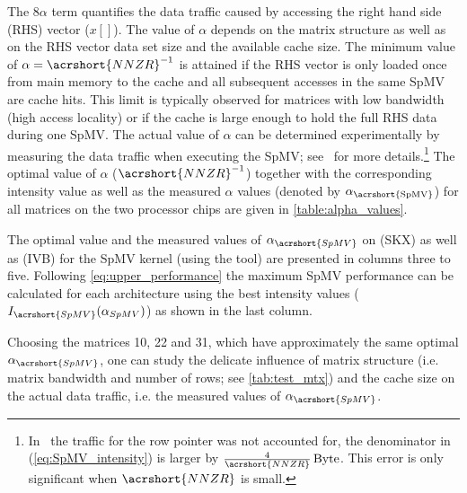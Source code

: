 The $8\alpha$ term quantifies the data traffic caused by accessing the right hand side (RHS) vector ($x[]$). The value of $\alpha$ depends on the matrix structure as well as on the RHS vector data set size and the available cache size. The minimum value of $\alpha=\acrshort{NNZR}^{-1}$ is attained if the RHS vector is only loaded once from main memory to the cache and all subsequent accesses in the same \acrshort{SpMV} are cache hits.  This limit is typically observed for matrices with low bandwidth (high access locality) or if the cache is large enough to hold the full RHS data during one \acrshort{SpMV}. The actual value of $\alpha$ can be determined experimentally by measuring the data traffic when executing the \acrshort{SpMV}; see~\cite{Moritz_sell} for more details.\footnote{In~\cite{Moritz_sell} the traffic for the row pointer was not accounted for, \ie the denominator in (\ref{eq:SpMV_intensity}) is larger by $\frac{4}{\acrshort{NNZR}}\,\BYTE$. This error is only significant when $\acrshort{NNZR}$ is small.}  The optimal value of $\alpha$ ($\acrshort{NNZR}^{-1}$) together with the corresponding intensity value as well as the measured $\alpha$ values (denoted by $\alpha_\mathrm{\acrshort{SpMV}}$) for all matrices on the two processor chips are given in \cref{table:alpha_values}. 
\begin{table}[htbp]
	\footnotesize
	\caption{The optimal value and the measured values of $\alpha_{\acrshort{SpMV}}$ on \SKX (SKX) as well as \IVB (IVB) for the \acrshort{SpMV} kernel (using the \LIKWID tool) are presented in columns three to five. Following \cref{eq:upper_performance} the maximum \acrshort{SpMV} performance can be calculated for each architecture using the best intensity values ($I_{\acrshort{SpMV}}(\alpha_{SpMV})$) as shown in the last column. }
	\label{table:alpha_values}
	\begin{center}
		
	\end{center}
\end{table}
 Choosing the matrices 10, 22 and 31, which have approximately the same optimal $\alpha_{\acrshort{SpMV}}$, one can study the delicate influence of matrix structure (i.e. matrix bandwidth and number of rows; see \cref{tab:test_mtx}) and the cache size on the actual data traffic, i.e. the measured values of $\alpha_{\acrshort{SpMV}}$.

